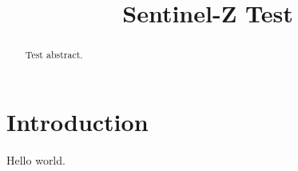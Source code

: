 \documentclass[conference]{IEEEtran}
\begin{document}
\title{Sentinel-Z Test}
\author{}
\maketitle
\begin{abstract}
Test abstract.
\end{abstract}
\section{Introduction}
Hello world.
\end{document}
